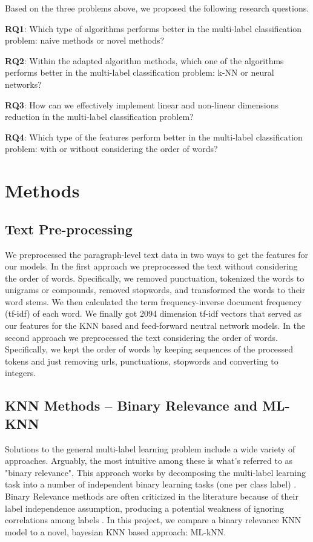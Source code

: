 \documentclass[11pt]{article}
\begin{document}
Based on the three problems above, we proposed the following research questions.

\textbf{RQ1}: Which type of algorithms performs better in the multi-label classification problem: naive methods or novel methods? 

\textbf{RQ2}: Within the adapted algorithm methods, which one of the algorithms performs better in the multi-label classification problem: k-NN or neural networks?

\textbf{RQ3}: How can we effectively implement linear and non-linear dimensions reduction in the multi-label classification problem?

\textbf{RQ4}: Which type of the features perform better in the multi-label classification problem: with or without considering the order of words? 

\section{Methods}

\subsection{Text Pre-processing}
We preprocessed the paragraph-level text data in two ways to get the features for our models. In the first approach we preprocessed the text without considering the order of words. Specifically, we removed punctuation, tokenized the words to unigrams or compounds, removed stopwords, and transformed the words to their word stems. We then calculated the term frequency-inverse document frequency (tf-idf) of each word. We finally got 2094 dimension tf-idf vectors that served as our features for the KNN based and feed-forward neutral network models. In the second approach we preprocessed the text considering the order of words. Specifically, we kept the order of words by keeping sequences of the processed tokens and just removing urls, punctuations, stopwords and converting to integers. 

\subsection{KNN Methods -- Binary Relevance and ML-KNN}

Solutions to the general multi-label learning problem include a wide variety of approaches. Arguably, the most intuitive among these is what's referred to as "binary relevance". This approach works by decomposing the multi-label learning task into a number of independent binary learning tasks (one per class label) \autocite{brOverview}. Binary Relevance methods are often criticized in the literature because of their label independence assumption, producing a potential weakness of ignoring correlations among labels \autocite{brEfficacy}. In this project, we compare a binary relevance KNN model to a novel, bayesian KNN based approach: ML-kNN.
\end{document}
